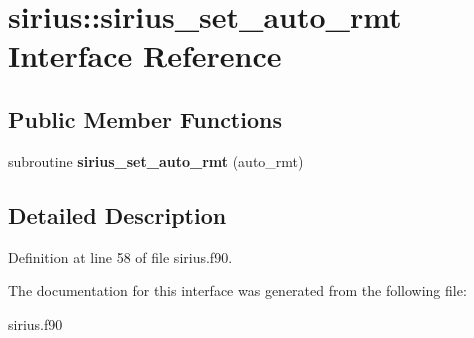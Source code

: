 \hypertarget{interfacesirius_1_1sirius__set__auto__rmt}{}\section{sirius\+:\+:sirius\+\_\+set\+\_\+auto\+\_\+rmt Interface Reference}
\label{interfacesirius_1_1sirius__set__auto__rmt}
\subsection*{Public Member Functions}
\begin{DoxyCompactItemize}
\item 
\hypertarget{interfacesirius_1_1sirius__set__auto__rmt_ac3a52c4a39eaf314a1b4c7dd29049e4f}{}subroutine {\bfseries sirius\+\_\+set\+\_\+auto\+\_\+rmt} (auto\+\_\+rmt)\label{interfacesirius_1_1sirius__set__auto__rmt_ac3a52c4a39eaf314a1b4c7dd29049e4f}

\end{DoxyCompactItemize}


\subsection{Detailed Description}


Definition at line 58 of file sirius.\+f90.



The documentation for this interface was generated from the following file\+:\begin{DoxyCompactItemize}
\item 
sirius.\+f90\end{DoxyCompactItemize}
